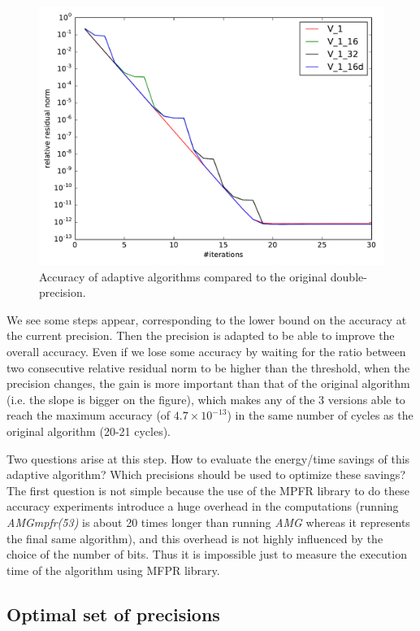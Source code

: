 \documentclass[sigplan]{acmart}
\begin{document}
   \begin{figure} \centering
    \includegraphics[width=0.8\linewidth]{figs/prec_incr.pdf}
    \caption{Accuracy of adaptive algorithms compared to the original double-precision.}
    \label{fig.prec_incr}
   \end{figure}
   
   We see some steps appear, corresponding to the lower bound on the accuracy at the current precision. Then the precision is adapted to be able to improve the overall accuracy. Even if we lose some accuracy by waiting for the ratio
   between two consecutive relative residual norm to be higher than the threshold, when the precision changes, the gain is more important than that of the original algorithm (i.e. the slope is bigger on the figure), which makes any of
   the 3 versions able to reach the maximum accuracy (of $4.7\times 10^{-13}$) in the same number of cycles as the original algorithm (20-21 cycles).
   
   Two questions arise at this step. How to evaluate the energy/time savings of this adaptive algorithm? Which precisions should be used to optimize these savings?\\
   The first question is not simple because the use of the MPFR library to do these accuracy experiments introduce a huge overhead in the computations (running \emph{AMGmpfr(53)} is about 20 times longer than running \emph{AMG} whereas it
   represents the final same algorithm), and this overhead is not highly influenced by the choice of the number of bits. Thus it is impossible just to measure the execution time of the algorithm using MFPR library.
   
   \subsection{Optimal set of precisions}
   
\end{document}
